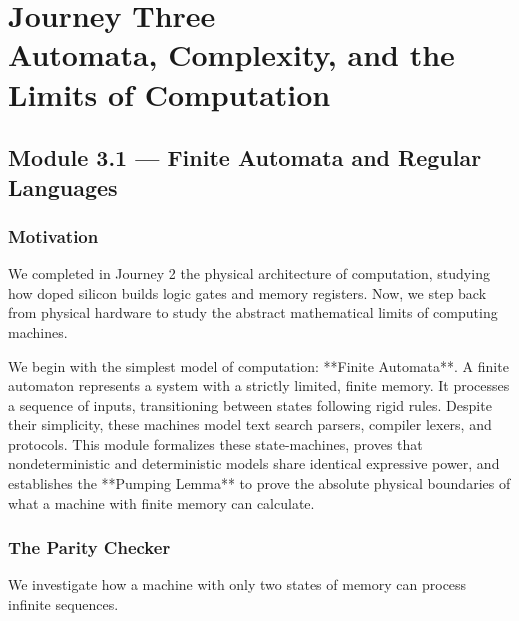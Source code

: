 \documentclass[12pt, a4paper]{book}
\begin{document}
\setcounter{chapter}{2}
\chapter[Journey 3 --- Automata, Complexity, and the Limits of Computation]
        {Journey Three\\[8pt]
         \textcolor{ModuleColor}{\large Automata, Complexity, and the Limits of Computation}}
\setcounter{section}{0}

\section{Module 3.1 --- Finite Automata and Regular Languages}
\label{sec:mod3.1}

\subsection*{Motivation}

We completed in Journey 2 the physical architecture of computation, studying how doped silicon builds logic gates and memory registers.
Now, we step back from physical hardware to study the abstract mathematical limits of computing machines.

We begin with the simplest model of computation: **Finite Automata**.
A finite automaton represents a system with a strictly limited, finite memory.
It processes a sequence of inputs, transitioning between states following rigid rules.
Despite their simplicity, these machines model text search parsers, compiler lexers, and protocols.
This module formalizes these state-machines, proves that nondeterministic and deterministic models share identical expressive power, and establishes the **Pumping Lemma** to prove the absolute physical boundaries of what a machine with finite memory can calculate.

\subsection{The Parity Checker}

We investigate how a machine with only two states of memory can process infinite sequences.
\end{document}
